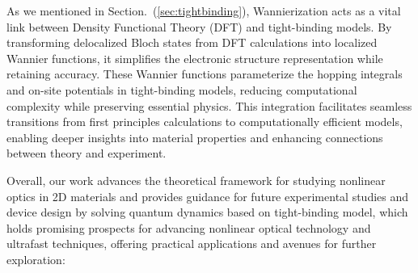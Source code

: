 As we mentioned in Section.~(\ref{sec:tightbinding}), Wannierization acts as a vital link between Density Functional Theory (DFT) and tight-binding models. By transforming delocalized Bloch states from DFT calculations into localized Wannier functions, it simplifies the electronic structure representation while retaining accuracy. These Wannier functions parameterize the hopping integrals and on-site potentials in tight-binding models, reducing computational complexity while preserving essential physics. This integration facilitates seamless transitions from first principles calculations to computationally efficient models, enabling deeper insights into material properties and enhancing connections between theory and experiment.

\color{black}
Overall, our work advances the theoretical framework for studying nonlinear optics in 2D materials and provides guidance for future experimental studies and device design by solving quantum dynamics based on tight-binding model, which holds promising prospects for advancing nonlinear optical technology and ultrafast techniques, offering practical applications and avenues for further exploration:
